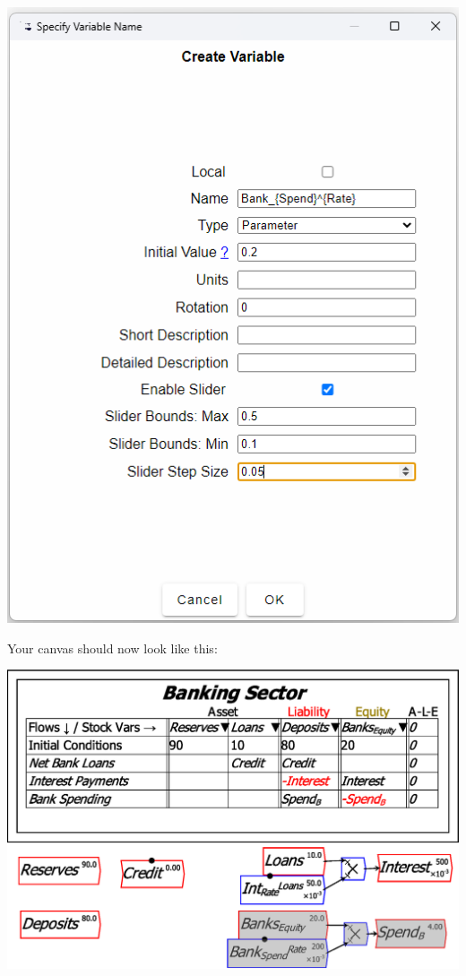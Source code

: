 \includegraphics{images/MonetaryModel01GodleyTable05DefineFlows04}

Your canvas should now look like this:

\includegraphics{images/MonetaryModel01GodleyTable05DefineFlows05}

